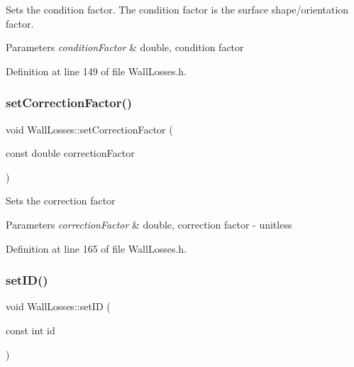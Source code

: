 Sets the condition factor. The condition factor is the surface shape/orientation factor. 
\begin{DoxyParams}{Parameters}
{\em condition\+Factor} & double, condition factor \\
\hline
\end{DoxyParams}


Definition at line 149 of file Wall\+Losses.\+h.

\mbox{\label{class_wall_losses_affdf3f6c3d54d73c7f91e1515fb12533}} 
\subsubsection{\texorpdfstring{set\+Correction\+Factor()}{setCorrectionFactor()}}
{\footnotesize\ttfamily void Wall\+Losses\+::set\+Correction\+Factor (\begin{DoxyParamCaption}\item[{const double}]{correction\+Factor }\end{DoxyParamCaption})\hspace{0.3cm}{\ttfamily [inline]}}

Sets the correction factor 
\begin{DoxyParams}{Parameters}
{\em correction\+Factor} & double, correction factor -\/ unitless \\
\hline
\end{DoxyParams}


Definition at line 165 of file Wall\+Losses.\+h.

\mbox{\label{class_wall_losses_a3a135d9bfd6c6f1c4742031ab568b26d}} 
\subsubsection{\texorpdfstring{set\+I\+D()}{setID()}}
{\footnotesize\ttfamily void Wall\+Losses\+::set\+ID (\begin{DoxyParamCaption}\item[{const int}]{id }\end{DoxyParamCaption})\hspace{0.3cm}{\ttfamily [inline]}}

